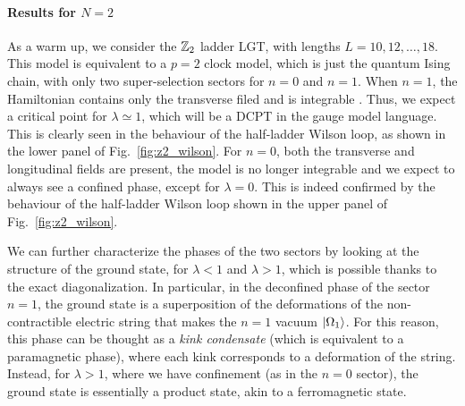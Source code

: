 \smallskip

%     



\paragraph{Results for \texorpdfstring{$N=2$}{N=2}}
As a warm up, we consider the $\mathbb{Z}_2$ ladder LGT, with lengths $L=10,12,\dots,18$.
This model is equivalent to a $p=2$ clock model, which is just the quantum Ising chain, with only two super-selection sectors for $n=0$ and $n=1$.
When $n=1$, the Hamiltonian  contains only the transverse filed and is integrable \cite{baxter1982exactlysm}.
Thus, we expect a critical point for $\lambda \simeq 1$, which will be a DCPT in the gauge model language.
This is clearly seen in the behaviour of the half-ladder Wilson loop, as shown in the lower panel of Fig.~\ref{fig:z2_wilson}.
For $n=0$, both the transverse and longitudinal fields  are present, the model is no longer integrable  \cite{banuls2011thermalization, kormos2017confinement, pomponio2022bloch} and we expect to always see a confined phase, except for $\lambda = 0$.
This is indeed confirmed by the behaviour of the half-ladder Wilson loop shown in the upper panel of Fig.~\ref{fig:z2_wilson}.

We can further characterize the phases of the two sectors by looking at the structure of the ground state, for $\lambda<1$ and $\lambda>1$, which is possible thanks to the exact diagonalization.
In particular, in the deconfined phase of the sector $n=1$, the ground state is a superposition of the deformations of the non-contractible electric string that makes the $n=1$ vacuum $\ket{\Omega_1}$.
For this reason, this phase can be thought as a \emph{kink condensate} \cite{fradkin1978order} (which is equivalent to a paramagnetic phase), where each kink corresponds to a deformation of the string.
Instead, for $\lambda > 1$, where we have confinement (as in the $n=0$ sector), the ground state is essentially a product state, akin to a ferromagnetic state. %


